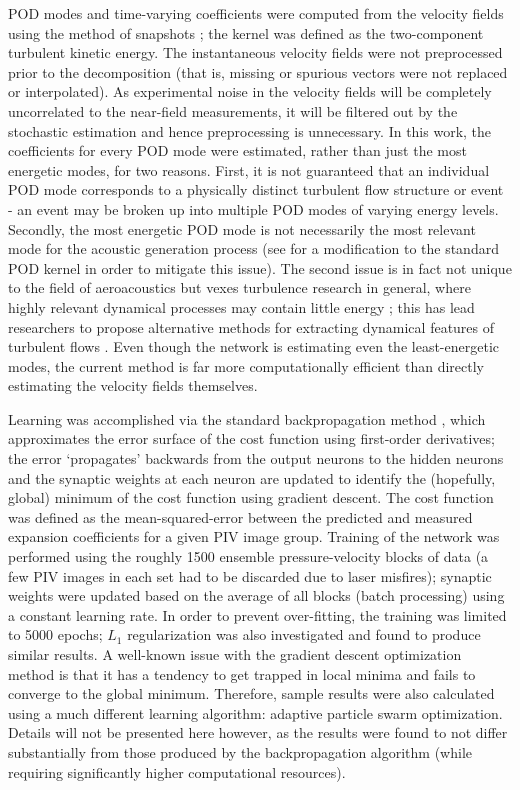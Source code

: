 POD modes and time-varying coefficients were computed from the velocity fields using the method of snapshots \citep{Sirovich1987}; the kernel was defined as the two-component turbulent kinetic energy.
The instantaneous velocity fields were not preprocessed prior to the decomposition (that is, missing or spurious vectors were not replaced or interpolated).
As experimental noise in the velocity fields will be completely uncorrelated to the near-field measurements, it will be filtered out by the stochastic estimation and hence preprocessing is unnecessary.
In this work, the coefficients for every POD mode were estimated, rather than just the most energetic modes, for two reasons.
First, it is not guaranteed that an individual POD mode corresponds to a physically distinct turbulent flow structure or event - an event may be broken up into multiple POD modes of varying energy levels.
Secondly, the most energetic POD mode is not necessarily the most relevant mode for the acoustic generation process (see \citet{Jordan2007} for a modification to the standard POD kernel in order to mitigate this issue).
The second issue is in fact not unique to the field of aeroacoustics but vexes turbulence research in general, where highly relevant dynamical processes may contain little energy \citep{Noack2008}; this has lead researchers to propose alternative methods for extracting dynamical features of turbulent flows \citep{Schmid2010}.
Even though the network is estimating even the least-energetic modes, the current method is far more computationally efficient than directly estimating the velocity fields themselves.

Learning was accomplished via the standard backpropagation method \citep{Haykin1994}, which approximates the error surface of the cost function using first-order derivatives; the error `propagates' backwards from the output neurons to the hidden neurons and the synaptic weights at each neuron are updated to identify the (hopefully, global) minimum of the cost function using gradient descent.
The cost function was defined as the mean-squared-error between the predicted and measured expansion coefficients for a given PIV image group.
Training of the network was performed using the roughly 1500 ensemble pressure-velocity blocks of data (a few PIV images in each set had to be discarded due to laser misfires); synaptic weights were updated based on the average of all blocks (batch processing) using a constant learning rate.
In order to prevent over-fitting, the training was limited to 5000 epochs; $L_1$ regularization was also investigated and found to produce similar results.
A well-known issue with the gradient descent optimization method is that it has a tendency to get trapped in local minima and fails to converge to the global minimum.
Therefore, sample results were also calculated using a much different learning algorithm: adaptive particle swarm optimization.
Details will not be presented here however, as the results were found to not differ substantially from those produced by the backpropagation algorithm (while requiring significantly higher computational resources).


